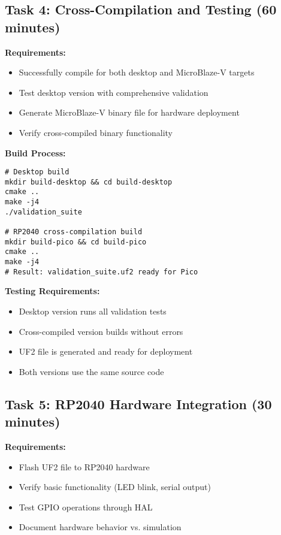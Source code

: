 \documentclass[11pt,a4paper]{article}
\begin{document}
\subsection{Task 4: Cross-Compilation and Testing (60 minutes)}

\textbf{Requirements:}
\begin{itemize}
    \item Successfully compile for both desktop and MicroBlaze-V targets
    \item Test desktop version with comprehensive validation
    \item Generate MicroBlaze-V binary file for hardware deployment
    \item Verify cross-compiled binary functionality
\end{itemize}

\textbf{Build Process:}
\begin{verbatim}
# Desktop build
mkdir build-desktop && cd build-desktop
cmake ..
make -j4
./validation_suite

# RP2040 cross-compilation build
mkdir build-pico && cd build-pico
cmake ..
make -j4
# Result: validation_suite.uf2 ready for Pico
\end{verbatim}

\textbf{Testing Requirements:}
\begin{itemize}
    \item Desktop version runs all validation tests
    \item Cross-compiled version builds without errors
    \item UF2 file is generated and ready for deployment
    \item Both versions use the same source code
\end{itemize}

\subsection{Task 5: RP2040 Hardware Integration (30 minutes)}

\textbf{Requirements:}
\begin{itemize}
    \item Flash UF2 file to RP2040 hardware
    \item Verify basic functionality (LED blink, serial output)
    \item Test GPIO operations through HAL
    \item Document hardware behavior vs. simulation
\end{itemize}
\end{document}
